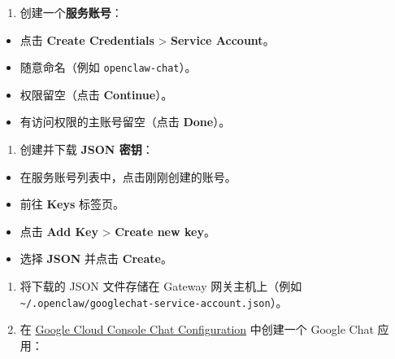 \begin{enumerate}
  \item 创建一个\textbf{服务账号}：
\end{enumerate}

\begin{itemize}
  \item 点击 \textbf{Create Credentials} > \textbf{Service Account}。
  \item 随意命名（例如 \texttt{openclaw-chat}）。
  \item 权限留空（点击 \textbf{Continue}）。
  \item 有访问权限的主账号留空（点击 \textbf{Done}）。
\end{itemize}

\begin{enumerate}
  \item 创建并下载 \textbf{JSON 密钥}：
\end{enumerate}

\begin{itemize}
  \item 在服务账号列表中，点击刚刚创建的账号。
  \item 前往 \textbf{Keys} 标签页。
  \item 点击 \textbf{Add Key} > \textbf{Create new key}。
  \item 选择 \textbf{JSON} 并点击 \textbf{Create}。
\end{itemize}

\begin{enumerate}
  \item 将下载的 JSON 文件存储在 Gateway 网关主机上（例如 \texttt{\textasciitilde{}/.openclaw/googlechat-service-account.json}）。
  \item 在 \href{https://console.cloud.google.com/apis/api/chat.googleapis.com/hangouts-chat}{Google Cloud Console Chat Configuration} 中创建一个 Google Chat 应用：
\end{enumerate}


